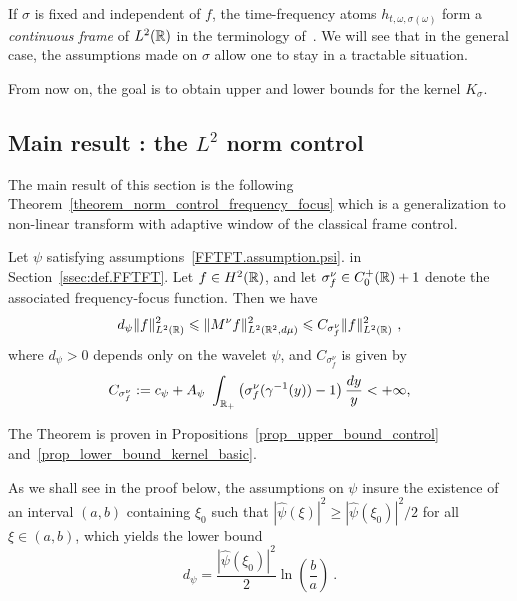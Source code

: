 	\begin{remark}
		If $\sigma$ is fixed and independent of $f$, the time-frequency atoms $h_{t,\omega,\sigma(\omega)}$ form a \textit{continuous frame} of $L^2(\mathbb{R})$ in the terminology of~\cite{Ali2000coherent,Dahlke2008generalized}. We will see that in the general case, the assumptions made on $\sigma$ allow one to stay in a tractable situation.
\end{remark} 
From now on, the goal is to obtain upper and lower bounds for the kernel $K_\sigma$.

\subsection{Main result : the $L^2$ norm control}\label{ssection_norm_control_frequency_focus}

The main result of this section is the following Theorem~\ref{theorem_norm_control_frequency_focus} which is a generalization to non-linear transform with adaptive window of the classical frame control.
\begin{theorem}\label{theorem_norm_control_frequency_focus}
Let $\psi$ satisfying assumptions~\ref{FFTFT.assumption.psi}. in Section~{\ref{ssec:def.FFTFT}}.
	Let $f\in H^2(\mathbb{R})$,
 and let $\sigma^\nu_f\in C_0^+(\mathbb{R})+1$ denote the associated frequency-focus function.
    Then we have
	\begin{equation}
		d_\psi\|f\|_{L^2(\R)}^2 \leqslant \|M^\nu f \|_{L^2(\R^2,d\mu)}^2 \leqslant C_{\sigma_f^\nu}\|f\|_{L^2(\R)}^2\ ,
	\end{equation}
	where $d_\psi>0$ depends only on the wavelet $\psi$, and $C_{\sigma_f^\nu}$ is given by
	\begin{equation}
		C_{\sigma_f^\nu} := c_\psi + A_\psi\ \int_{\R_+}\left(\sigma_f^\nu(\gamma^{-1}(y))-1\right)\frac{dy}{y} <+\infty,
	\end{equation}
\end{theorem}
The Theorem is proven in Propositions~\ref{prop_upper_bound_control} and~\ref{prop_lower_bound_kernel_basic}.
\begin{remark}
\label{rem:FFTFT.lower.bound}
As we shall see in the proof below, the assumptions on $\psi$ insure the existence of an interval $(a,b)$ containing $\xi_0$ such that $|\hat\psi(\xi)|^2 \ge |\hat\psi(\xi_0)|^2/2$ for all $\xi\in (a,b)$, which yields the lower bound
\[
d_\psi = \frac{|\hat{\psi}(\xi_0)|^2}{2}\ln\left(\frac{b}{a}\right)\ .
\]
\end{remark}
